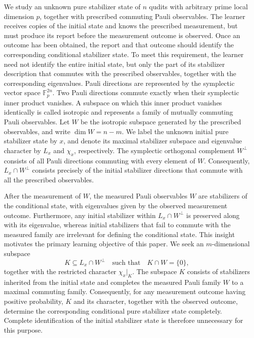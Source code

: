 \documentclass[11pt]{article}
\newcommand{\F}{\mathbb F}
\newcommand{\1}{\mathbf 1}
\theoremstyle{plain}
\theoremstyle{definition}
\theoremstyle{remark}
\begin{document}
We study an unknown pure stabilizer state of $n$ qudits with arbitrary prime local dimension $p$, together with prescribed commuting Pauli observables.   
The learner receives copies of the initial state and knows the prescribed measurement, but must produce its report before the measurement outcome is observed. Once an outcome has been obtained, the report and that outcome should identify the corresponding conditional stabilizer state.
To meet this requirement, the learner need not identify the entire initial state, but only the part of its stabilizer description that commutes with the prescribed observables, together with the corresponding eigenvalues. 
Pauli directions are represented by the symplectic vector space $\F_p^{2n}$. 
Two Pauli directions commute exactly when their symplectic inner product vanishes. 
A subspace on which this inner product vanishes identically is called isotropic and represents a family of mutually commuting Pauli observables. 
Let $W$ be the isotropic subspace generated by the prescribed observables, and write $\dim W=n-m$. 
We label the unknown initial pure stabilizer state by $x$, and 
denote its maximal stabilizer subspace and eigenvalue character by $L_x$ and $\chi_x$, respectively. 
The symplectic orthogonal complement $W^\perp$ consists of all Pauli directions commuting with every element of $W$. 
Consequently, $L_x\cap W^\perp$ consists precisely of the initial stabilizer directions that commute with all the prescribed observables.

After the measurement of $W$, the measured Pauli observables $W$ are stabilizers of 
the conditional state, with eigenvalues given by the observed measurement outcome.  
Furthermore, any initial stabilizer within $L_x\cap W^\perp$ is preserved along with its eigenvalue, whereas initial stabilizers that fail to commute with the measured family are irrelevant for defining the conditional state.  
This insight motivates the primary learning objective of this paper. 
We seek an $m$-dimensional subspace
\[
 K\subseteq L_x\cap W^\perp \quad\text{such that}\quad K\cap W=\{0\},
\]
together with the restricted character $\chi_x|_K$.  
The subspace $K$ consists of stabilizers inherited from the initial state and completes the measured Pauli family $W$ to a maximal commuting family.  
Consequently, for any measurement outcome having positive probability, $K$ and its character, together with the observed outcome, determine the corresponding conditional pure stabilizer state completely.  
Complete identification of the initial stabilizer state is therefore unnecessary for this purpose.  
\end{document}
